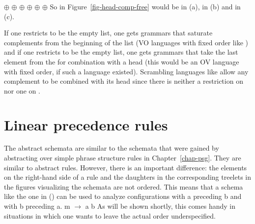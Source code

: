 \eal
\ex \eliste{} $\oplus$  $\oplus$  
\ex {} $\oplus$  $\oplus$  
\ex {} $\oplus$  $\oplus$ \eliste 
\zl
So  in Figure~\ref{fig-head-comp-free} would be \npnom in (a), \npdat in (b) and \npacc in (c).

If one restricts  to be the
empty list, one gets grammars that saturate complements from the beginning of the list (VO languages
with fixed order like ) and if one restricts  to be the empty list, one gets grammars that take the last
element from the \compsl for combination with a head (this would be an OV language with fixed
order, if such a language existed). Scrambling languages like  allow any
complement to be combined with its head since there is neither a restriction on  nor one on .%


\section{Linear precedence rules}
\label{sec-lp-rules}

The abstract schemata are similar to the schemata that were gained by abstracting over simple phrase
structure rules in Chapter~\ref{chap-psg}. They are similar to abstract \xbar rules. However, there
is an important difference: the elements on the right-hand side of a rule and the daughters in the
corresponding treelets in the figures visualizing the schemata are not ordered. This means that a
schema like the one in () can be used to analyze configurations with a preceding b and with
b preceding a.
\ea
m $\to$ a b
\z
As will be shown shortly, this comes handy in situations in which one wants to leave the actual
order underspecified.

